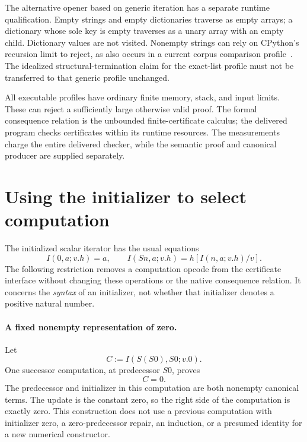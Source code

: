 \documentclass[11pt,letterpaper]{article}
\theoremstyle{definition}\newtheorem{definition}[theorem]{Definition}
\theoremstyle{remark}\newtheorem{remark}[theorem]{Remark}
\begin{document}
The alternative opener based on generic iteration has a separate
runtime qualification.  Empty strings and empty dictionaries traverse
as empty arrays; a dictionary whose sole key is empty traverses as a
unary array with an empty child.  Dictionary values are not visited.
Nonempty strings can rely on CPython's recursion limit to reject, as
also occurs in a current corpus comparison profile~\cite{transient}.
The idealized structural-termination claim for the exact-list profile
must not be transferred to that generic profile unchanged.

All executable profiles have ordinary finite memory, stack, and input
limits.  These can reject a sufficiently large otherwise valid proof.
The formal consequence relation is the unbounded finite-certificate
calculus; the delivered program checks certificates within its runtime
resources.  The measurements charge the entire delivered checker,
while the semantic proof and canonical producer are supplied separately.


\section{Using the initializer to select computation}
\label{sec:seed-dispatch}

The initialized scalar iterator has the usual equations
\[
 I(0,a;v.h)=a,\qquad
 I(Sn,a;v.h)=h[I(n,a;v.h)/v].
 \tag{I0, IS}
\]
The following restriction removes a computation opcode from the
certificate interface without changing these operations or the native
consequence relation.  It concerns the \emph{syntax} of an initializer,
not whether that initializer denotes a positive natural number.

\paragraph{A fixed nonempty representation of zero.}
Let
\[
               C:=I(S(S0),S0;v.0).
 \tag{Auxiliary zero}\label{eq:dispatch-zero-term}
\]
One successor computation, at predecessor $S0$, proves
\[
                              C=0.\label{eq:dispatch-zero}
 \tag{Zero certificate}
\]
The predecessor and initializer in this computation are both nonempty
canonical terms.  The update is the constant zero, so the right side of
the computation is exactly zero.  This construction does not use a
previous computation with initializer zero, a zero-predecessor repair,
an induction, or a presumed identity for a new numerical constructor.
\end{document}
